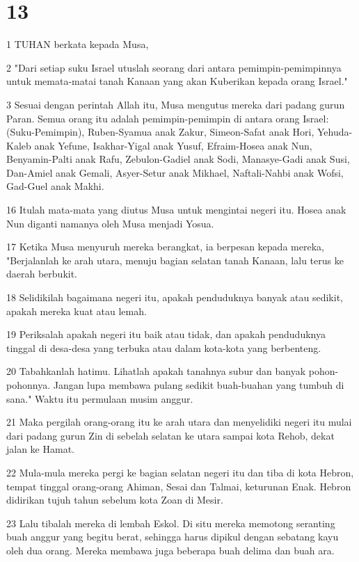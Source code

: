 \chapter{13}

\par 1 TUHAN berkata kepada Musa,
\par 2 "Dari setiap suku Israel utuslah seorang dari antara pemimpin-pemimpinnya untuk memata-matai tanah Kanaan yang akan Kuberikan kepada orang Israel."
\par 3 Sesuai dengan perintah Allah itu, Musa mengutus mereka dari padang gurun Paran. Semua orang itu adalah pemimpin-pemimpin di antara orang Israel: (Suku-Pemimpin), Ruben-Syamua anak Zakur, Simeon-Safat anak Hori, Yehuda-Kaleb anak Yefune, Isakhar-Yigal anak Yusuf, Efraim-Hosea anak Nun, Benyamin-Palti anak Rafu, Zebulon-Gadiel anak Sodi, Manasye-Gadi anak Susi, Dan-Amiel anak Gemali, Asyer-Setur anak Mikhael, Naftali-Nahbi anak Wofsi, Gad-Guel anak Makhi.
\par 16 Itulah mata-mata yang diutus Musa untuk mengintai negeri itu. Hosea anak Nun diganti namanya oleh Musa menjadi Yosua.
\par 17 Ketika Musa menyuruh mereka berangkat, ia berpesan kepada mereka, "Berjalanlah ke arah utara, menuju bagian selatan tanah Kanaan, lalu terus ke daerah berbukit.
\par 18 Selidikilah bagaimana negeri itu, apakah penduduknya banyak atau sedikit, apakah mereka kuat atau lemah.
\par 19 Periksalah apakah negeri itu baik atau tidak, dan apakah penduduknya tinggal di desa-desa yang terbuka atau dalam kota-kota yang berbenteng.
\par 20 Tabahkanlah hatimu. Lihatlah apakah tanahnya subur dan banyak pohon-pohonnya. Jangan lupa membawa pulang sedikit buah-buahan yang tumbuh di sana." Waktu itu permulaan musim anggur.
\par 21 Maka pergilah orang-orang itu ke arah utara dan menyelidiki negeri itu mulai dari padang gurun Zin di sebelah selatan ke utara sampai kota Rehob, dekat jalan ke Hamat.
\par 22 Mula-mula mereka pergi ke bagian selatan negeri itu dan tiba di kota Hebron, tempat tinggal orang-orang Ahiman, Sesai dan Talmai, keturunan Enak. Hebron didirikan tujuh tahun sebelum kota Zoan di Mesir.
\par 23 Lalu tibalah mereka di lembah Eskol. Di situ mereka memotong seranting buah anggur yang begitu berat, sehingga harus dipikul dengan sebatang kayu oleh dua orang. Mereka membawa juga beberapa buah delima dan buah ara.
